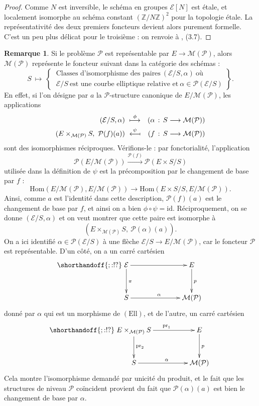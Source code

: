 \documentclass[11pt,a4paper]{article}
\newcommand{\Z}{\mathbb{Z}}
\newcommand{\E}{\mathcal{E}}
\renewcommand{\Pr}{\mathcal{P}}
\newcommand{\M}{\mathcal{M}}
\newcommand{\vers}{\longrightarrow}
\newcommand{\Hom}{\mathrm{Hom}}
\newcommand{\Ell}{\mathrm{Ell}}
\newcommand{\de}{\,:\,}
\newcommand{\id}{\mathrm{id}}
\newcommand{\pr}{\mathrm{pr}}
\theoremstyle{definition}
\newtheorem*{rem}{Remarque}
\begin{document}
\begin{proof}
Comme $N$ est inversible, le schéma en groupes $\E[N]$ est étale, et localement isomorphe au schéma constant $(\Z/N\Z)^2$ pour la topologie étale. La représentativité des deux premiers foncteurs devient alors purement formelle. C'est un peu plus délicat pour le troisième : on renvoie à \cite{KaMa}, (3.7).
\end{proof}

\begin{rem} Si le problème $\Pr$ est représentable par $E\vers \M(\Pr)$, alors $\M(\Pr)$ représente le foncteur suivant dans la catégorie des schémas :
$$S\ \longmapsto\ \left.
\begin{cases}\ \text{Classes\ d'isomorphisme\ des\ paires}\ (\E/S,\alpha)\ \text{où}\ \\
 \ \E/S\ \text{est\ une\ courbe\ elliptique\ relative\ et}\ \alpha\in \Pr(\E/S)
\end{cases} \right\}.$$
En effet, si l'on désigne par $a$ la $\Pr$-structure canonique de $E/\M(\Pr)$, les applications
$$\begin{aligned}
(\E/S, \alpha)\ &\overset{\phi}{\longmapsto}  &(\alpha\de S\vers \M(\Pr)) \\
(E \times_{\M(\Pr)} S,\ \Pr(f)(a))\ &\overset{\psi}{\mathrel{\reflectbox{\ensuremath{\longmapsto}}}} &(f\de S\vers \M(\Pr))
\end{aligned}$$
sont des isomorphismes réciproques. Vérifions-le : par fonctorialité, l'application
$$\Pr(E/\M(\Pr)) \overset{\Pr(f)} \vers \Pr(E\times S/S)$$
utilisée dans la définition de $\psi$ est la précomposition par le changement de base par $f$ :
$$\Hom(E/\M(\Pr), E/\M(\Pr)) \vers \Hom(E\times S/S, E/\M(\Pr)).$$
Ainsi, comme $a$ est l'identité dans cette description, $\Pr(f)(a)$ est le changement de base par $f$, et ainsi on a bien $\phi\circ\psi = \id.$ Réciproquement, on se donne $(\E/S, \alpha)$ et on veut montrer que cette paire est isomorphe à
$$(E \times_{\M(\Pr)} S,\ \Pr(\alpha)(a)).$$
On a ici identifié $\alpha\in \Pr(\E/S)$ à une flèche $\E/S \vers E/\M(\Pr)$, car le foncteur $\Pr$ est représentable. D'un côté, on a un carré cartésien
$$
\shorthandoff{;:!?}
\xymatrix @!=8mm {
\E \ar[d]^{\pi} \ar[rr] & & E \ar[d]^{p} \\
 S \ar[rr]^{\alpha} & & \M(\Pr)
}
$$
donné par $\alpha$ qui est un morphisme de $(\Ell)$, et de l'autre, un carré cartésien
$$
\shorthandoff{;:!?}
\xymatrix @!=8mm {
E\times_{\M(\Pr)} S \ar[d]^{\pr_2} \ar[rr]^{\pr_1} & & E \ar[d]^{p} \\
 S \ar[rr]^{\alpha} & & \M(\Pr)
}
$$
Cela montre l'isomorphisme demandé par unicité du produit, et le fait que les structures de niveau $\Pr$ coïncident provient du fait que $\Pr(\alpha)(a)$ est bien le changement de base par $\alpha$.
\end{rem}
\end{document}

